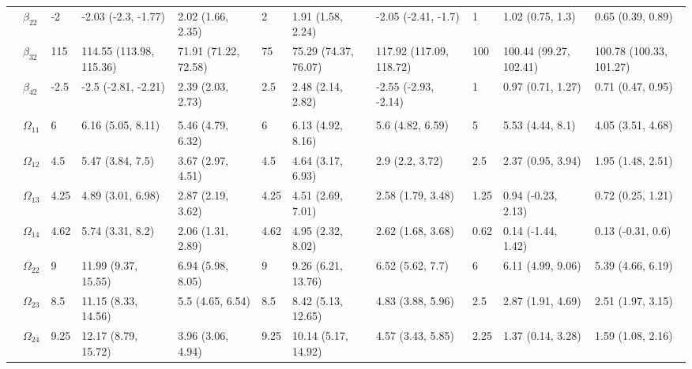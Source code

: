 \documentclass[]{article}
\begin{document}
\begin{landscape}
\begin{table}[t]
\begin{tabular}{lllllllllll}
\hspace{1em} & $\beta_{22}$ & -2 & -2.03 (-2.3, -1.77) & 2.02 (1.66, 2.35) & 2 & 1.91 (1.58, 2.24) & -2.05 (-2.41, -1.7) & 1 & 1.02 (0.75, 1.3) & 0.65 (0.39, 0.89)\\
\hspace{1em} & $\beta_{32}$ & 115 & 114.55 (113.98, 115.36) & 71.91 (71.22, 72.58) & 75 & 75.29 (74.37, 76.07) & 117.92 (117.09, 118.72) & 100 & 100.44 (99.27, 102.41) & 100.78 (100.33, 101.27)\\
\hspace{1em} & $\beta_{42}$ & -2.5 & -2.5 (-2.81, -2.21) & 2.39 (2.03, 2.73) & 2.5 & 2.48 (2.14, 2.82) & -2.55 (-2.93, -2.14) & 1 & 0.97 (0.71, 1.27) & 0.71 (0.47, 0.95)\\
\addlinespace[0.3em]
\multicolumn{11}{l}{\textbf{ }}\\
\hspace{1em} & $\Omega_{11}$ & 6 & 6.16 (5.05, 8.11) & 5.46 (4.79, 6.32) & 6 & 6.13 (4.92, 8.16) & 5.6 (4.82, 6.59) & 5 & 5.53 (4.44, 8.1) & 4.05 (3.51, 4.68)\\
\hspace{1em} & $\Omega_{12}$ & 4.5 & 5.47 (3.84, 7.5) & 3.67 (2.97, 4.51) & 4.5 & 4.64 (3.17, 6.93) & 2.9 (2.2, 3.72) & 2.5 & 2.37 (0.95, 3.94) & 1.95 (1.48, 2.51)\\
\hspace{1em} & $\Omega_{13}$ & 4.25 & 4.89 (3.01, 6.98) & 2.87 (2.19, 3.62) & 4.25 & 4.51 (2.69, 7.01) & 2.58 (1.79, 3.48) & 1.25 & 0.94 (-0.23, 2.13) & 0.72 (0.25, 1.21)\\
\hspace{1em} & $\Omega_{14}$ & 4.62 & 5.74 (3.31, 8.2) & 2.06 (1.31, 2.89) & 4.62 & 4.95 (2.32, 8.02) & 2.62 (1.68, 3.68) & 0.62 & 0.14 (-1.44, 1.42) & 0.13 (-0.31, 0.6)\\
\hspace{1em} & $\Omega_{22}$ & 9 & 11.99 (9.37, 15.55) & 6.94 (5.98, 8.05) & 9 & 9.26 (6.21, 13.76) & 6.52 (5.62, 7.7) & 6 & 6.11 (4.99, 9.06) & 5.39 (4.66, 6.19)\\
\hspace{1em} & $\Omega_{23}$ & 8.5 & 11.15 (8.33, 14.56) & 5.5 (4.65, 6.54) & 8.5 & 8.42 (5.13, 12.65) & 4.83 (3.88, 5.96) & 2.5 & 2.87 (1.91, 4.69) & 2.51 (1.97, 3.15)\\
\hspace{1em} & $\Omega_{24}$ & 9.25 & 12.17 (8.79, 15.72) & 3.96 (3.06, 4.94) & 9.25 & 10.14 (5.17, 14.92) & 4.57 (3.43, 5.85) & 2.25 & 1.37 (0.14, 3.28) & 1.59 (1.08, 2.16)\\

\end{tabular}
\end{table}
\end{landscape}
\end{document}
